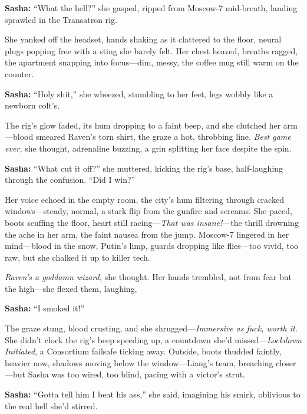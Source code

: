 \documentclass[12pt]{book}
\begin{document}
\vspace{0.5em}
\textbf{Sasha:} “What the hell?” she gasped, ripped from Moscow-7 mid-breath, landing sprawled in the Transatron rig.

She yanked off the headset, hands shaking as it clattered to the floor, neural plugs popping free with a sting she barely felt. Her chest heaved, breaths ragged, the apartment snapping into focus—dim, messy, the coffee mug still warm on the counter. 

\vspace{0.5em}
\textbf{Sasha:} “Holy shit,” she wheezed, stumbling to her feet, legs wobbly like a newborn colt’s.

The rig’s glow faded, its hum dropping to a faint beep, and she clutched her arm—blood smeared Raven’s torn shirt, the graze a hot, throbbing line. \emph{Best game ever,} she thought, adrenaline buzzing, a grin splitting her face despite the spin.

\vspace{0.5em}
\textbf{Sasha:} “What cut it off?” she muttered, kicking the rig’s base, half-laughing through the confusion. “Did I win?”

Her voice echoed in the empty room, the city’s hum filtering through cracked windows—steady, normal, a stark flip from the gunfire and screams. She paced, boots scuffing the floor, heart still racing—\emph{That was insane!}—the thrill drowning the ache in her arm, the faint nausea from the jump. Moscow-7 lingered in her mind—blood in the snow, Putin’s limp, guards dropping like flies—too vivid, too raw, but she chalked it up to killer tech. 

\emph{Raven’s a goddamn wizard,} she thought. Her hands trembled, not from fear but the high—she flexed them, laughing, 

\vspace{0.5em}
\textbf{Sasha:} “I smoked it!”

The graze stung, blood crusting, and she shrugged—\emph{Immersive as fuck, worth it.} She didn’t clock the rig’s beep speeding up, a countdown she’d missed—\emph{Lockdown Initiated}, a Consortium failsafe ticking away. Outside, boots thudded faintly, heavier now, shadows moving below the window—Liang’s team, breaching closer—but Sasha was too wired, too blind, pacing with a victor’s strut. 

\vspace{0.5em}
\textbf{Sasha:} “Gotta tell him I beat his ass,” she said, imagining his smirk, oblivious to the real hell she’d stirred.
\end{document}
